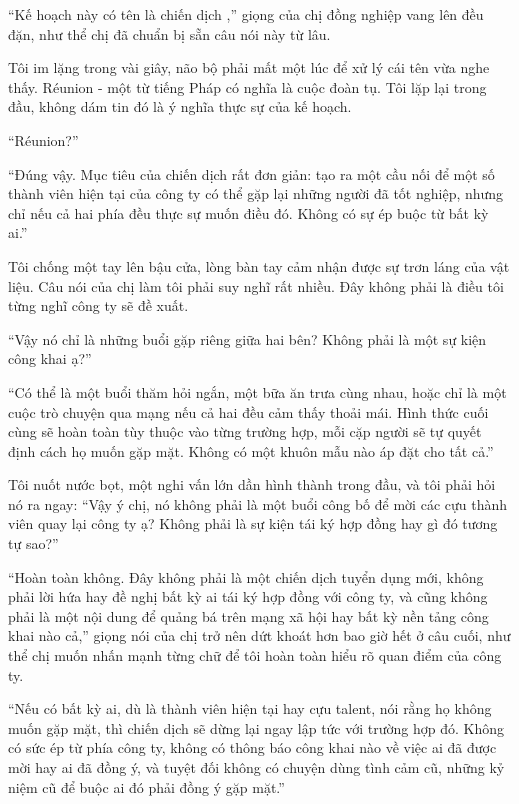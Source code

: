 \documentclass[../main.tex]{subfiles}
\begin{document}
``Kế hoạch này có tên là chiến dịch ,'' giọng của chị đồng nghiệp vang lên đều đặn, như thể chị đã chuẩn bị sẵn câu nói này từ lâu.

Tôi im lặng trong vài giây, não bộ phải mất một lúc để xử lý cái tên vừa nghe thấy. Réunion - một từ tiếng Pháp có nghĩa là cuộc đoàn tụ. Tôi lặp lại trong đầu, không dám tin đó là ý nghĩa thực sự của kế hoạch.

``Réunion?''

``Đúng vậy. Mục tiêu của chiến dịch rất đơn giản: tạo ra một cầu nối để một số thành viên hiện tại của công ty có thể gặp lại những người đã tốt nghiệp, nhưng chỉ nếu cả hai phía đều thực sự muốn điều đó. Không có sự ép buộc từ bất kỳ ai.''

Tôi chống một tay lên bậu cửa, lòng bàn tay cảm nhận được sự trơn láng của vật liệu. Câu nói của chị làm tôi phải suy nghĩ rất nhiều. Đây không phải là điều tôi từng nghĩ công ty sẽ đề xuất.

``Vậy nó chỉ là những buổi gặp riêng giữa hai bên? Không phải là một sự kiện công khai ạ?''

``Có thể là một buổi thăm hỏi ngắn, một bữa ăn trưa cùng nhau, hoặc chỉ là một cuộc trò chuyện qua mạng nếu cả hai đều cảm thấy thoải mái. Hình thức cuối cùng sẽ hoàn toàn tùy thuộc vào từng trường hợp, mỗi cặp người sẽ tự quyết định cách họ muốn gặp mặt. Không có một khuôn mẫu nào áp đặt cho tất cả.''

Tôi nuốt nước bọt, một nghi vấn lớn dần hình thành trong đầu, và tôi phải hỏi nó ra ngay: ``Vậy ý chị, nó không phải là một buổi công bố để mời các cựu thành viên quay lại công ty ạ? Không phải là sự kiện tái ký hợp đồng hay gì đó tương tự sao?''

``Hoàn toàn không. Đây không phải là một chiến dịch tuyển dụng mới, không phải lời hứa hay đề nghị bất kỳ ai tái ký hợp đồng với công ty, và cũng không phải là một nội dung để quảng bá trên mạng xã hội hay bất kỳ nền tảng công khai nào cả,'' giọng nói của chị trở nên dứt khoát hơn bao giờ hết ở câu cuối, như thể chị muốn nhấn mạnh từng chữ để tôi hoàn toàn hiểu rõ quan điểm của công ty.

``Nếu có bất kỳ ai, dù là thành viên hiện tại hay cựu talent, nói rằng họ không muốn gặp mặt, thì chiến dịch sẽ dừng lại ngay lập tức với trường hợp đó. Không có sức ép từ phía công ty, không có thông báo công khai nào về việc ai đã được mời hay ai đã đồng ý, và tuyệt đối không có chuyện dùng tình cảm cũ, những kỷ niệm cũ để buộc ai đó phải đồng ý gặp mặt.''
\end{document}
